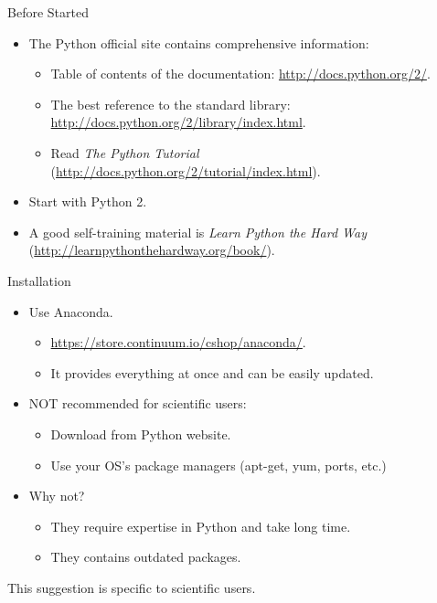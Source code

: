 \documentclass[dvips,xcolor=pst,14pt]{beamer}
\begin{document}
\begin{frame}{
%
Before Started
%
}
\begin{itemize}
  \item The Python official site contains comprehensive information:
  \begin{itemize}
    \item Table of contents of the documentation:
    \url{http://docs.python.org/2/}.
    \item The best reference to the standard library:
    \url{http://docs.python.org/2/library/index.html}.
    \item Read \textit{The Python Tutorial}
    (\url{http://docs.python.org/2/tutorial/index.html}).
  \end{itemize}
  \item Start with Python \alert{2}.
  \item A good self-training material is \textit{Learn Python the Hard Way}
  (\url{http://learnpythonthehardway.org/book/}).
\end{itemize}
\end{frame}

\begin{frame}{
%
Installation
%
}
\begin{itemize}
  \item Use Anaconda.
  \begin{itemize}
    \item \url{https://store.continuum.io/cshop/anaconda/}.
    \item It provides everything at once and can be easily updated.
  \end{itemize}
  \item NOT recommended for scientific users:
  \begin{itemize}
    \item Download from Python website.
    \item Use your OS's package managers (apt-get, yum, ports, etc.)
  \end{itemize}
  \item Why not?
  \begin{itemize}
    \item They require expertise in Python and take long time.
    \item They contains outdated packages.
  \end{itemize}
\end{itemize}
\begin{flushleft}
  \scriptsize *This suggestion is specific to scientific users.
\end{flushleft}
\end{frame}
\end{document}
